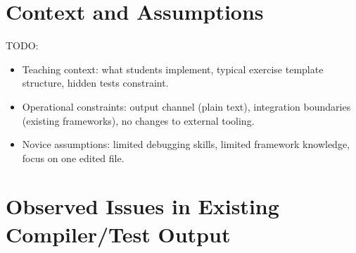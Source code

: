 \documentclass[
	bibliography=totoc,
	listof=totoc,
]{scrbook}
\begin{document}
\section{Context and Assumptions} %

\begin{marker}\begin{justify}
TODO:
\begin{itemize}
    \item Teaching context: what students implement, typical exercise template structure, hidden tests constraint.
    \item Operational constraints: output channel (plain text), integration boundaries (existing frameworks), no changes to external tooling.
    \item Novice assumptions: limited debugging skills, limited framework knowledge, focus on one edited file.
\end{itemize}
\end{justify}\end{marker}


\section{Observed Issues in Existing Compiler/Test Output} %
\end{document}
